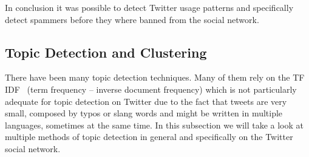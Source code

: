In conclusion it was possible to detect Twitter usage patterns and specifically detect spammers before they where banned from the social network. 

\subsection{Topic Detection and Clustering} 
\label{sub:topic_detection_on_twitter}
There have been many topic detection techniques. Many of them rely on the TF IDF~\cite{Baeza-Yates:1999:MIR:553876} (term frequency – inverse document frequency) which is not particularly adequate for topic detection on Twitter due to the fact that tweets are very small, composed by typos or slang words and might be written in multiple languages, sometimes at the same time. In this subsection we will take a look at multiple methods of topic detection in general and specifically on the Twitter social network.


